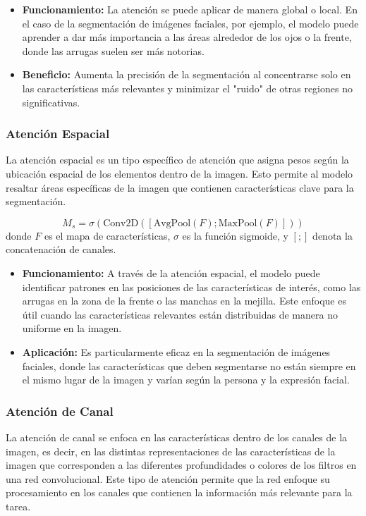 \begin{itemize}
    \item \textbf{Funcionamiento:} La atención se puede aplicar de manera global o local. En el caso de la segmentación de imágenes faciales, por ejemplo, el modelo puede aprender a dar más importancia a las áreas alrededor de los ojos o la frente, donde las arrugas suelen ser más notorias.
    \item \textbf{Beneficio:} Aumenta la precisión de la segmentación al concentrarse solo en las características más relevantes y minimizar el "ruido" de otras regiones no significativas. \parencite{autor2021atencion}
\end{itemize}

\subsubsection{Atención Espacial}  
La atención espacial es un tipo específico de atención que asigna pesos según la ubicación espacial de los elementos dentro de la imagen. Esto permite al modelo resaltar áreas específicas de la imagen que contienen características clave para la segmentación.  

\begin{equation}\label{eq:mapa_atencion_espacial}
    M_s = \sigma(\text{Conv2D}([\text{AvgPool}(F); \text{MaxPool}(F)]))
\end{equation}
donde $F$ es el mapa de características, $\sigma$ es la función sigmoide, y $[;]$ denota la concatenación de canales.


\begin{itemize}
    \item \textbf{Funcionamiento:} A través de la atención espacial, el modelo puede identificar patrones en las posiciones de las características de interés, como las arrugas en la zona de la frente o las manchas en la mejilla. Este enfoque es útil cuando las características relevantes están distribuidas de manera no uniforme en la imagen.
    \item \textbf{Aplicación:} Es particularmente eficaz en la segmentación de imágenes faciales, donde las características que deben segmentarse no están siempre en el mismo lugar de la imagen y varían según la persona y la expresión facial. \parencite{autor2020spa}
\end{itemize}

\subsubsection{Atención de Canal}  
La atención de canal se enfoca en las características dentro de los canales de la imagen, es decir, en las distintas representaciones de las características de la imagen que corresponden a las diferentes profundidades o colores de los filtros en una red convolucional. Este tipo de atención permite que la red enfoque su procesamiento en los canales que contienen la información más relevante para la tarea.  

